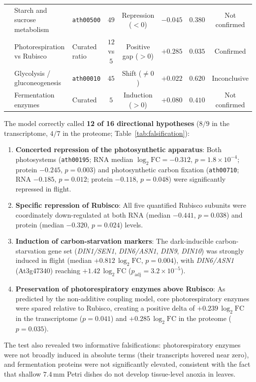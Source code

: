 \documentclass[10pt,twocolumn,a4paper]{article}
\begin{document}
\begin{table}[tbp]
{\begin{tabular}{lllccccc}
 & Starch and sucrose metabolism & \texttt{ath00500} & $49$ & Repression ($<0$) & $-0.045$ & $0.380$ & Not confirmed \\
 & Photorespiration vs Rubisco & Curated ratio & $12$ vs $5$ & Positive gap ($>0$) & $+0.285$ & $0.035$ & Confirmed \\
 & Glycolysis / gluconeogenesis & \texttt{ath00010} & $45$ & Shift ($\ne 0$) & $+0.022$ & $0.620$ & Inconclusive \\
 & Fermentation enzymes & Curated & $5$ & Induction ($>0$) & $+0.080$ & $0.410$ & Not confirmed \\
\bottomrule
\end{tabular}%
}
\end{table}

The model correctly called \textbf{12 of 16 directional hypotheses} ($8/9$ in the transcriptome, $4/7$ in the proteome; Table~\ref{tab:falsification}):
\begin{enumerate}
    \item \textbf{Concerted repression of the photosynthetic apparatus}: Both photosystems (\texttt{ath00195}; RNA median $\log_2\mathrm{FC} = -0.312$, $p = 1.8\times 10^{-4}$; protein $-0.245$, $p = 0.003$) and photosynthetic carbon fixation (\texttt{ath00710}; RNA $-0.185$, $p = 0.012$; protein $-0.118$, $p = 0.048$) were significantly repressed in flight.
    \item \textbf{Specific repression of Rubisco}: All five quantified Rubisco subunits were coordinately down-regulated at both RNA (median $-0.441$, $p = 0.038$) and protein (median $-0.320$, $p = 0.024$) levels.
    \item \textbf{Induction of carbon-starvation markers}: The dark-inducible carbon-starvation gene set (\textit{DIN1/SEN1}, \textit{DIN6/ASN1}, \textit{DIN9}, \textit{DIN10}) was strongly induced in flight (median $+0.812\,\log_2\mathrm{FC}$, $p = 0.004$), with \textit{DIN6/ASN1} (At3g47340) reaching $+1.42\,\log_2\mathrm{FC}$ ($p_{\text{adj}} = 3.2\times 10^{-5}$).
    \item \textbf{Preservation of photorespiratory enzymes above Rubisco}: As predicted by the non-additive coupling model, core photorespiratory enzymes were spared relative to Rubisco, creating a positive delta of $+0.239\,\log_2\mathrm{FC}$ in the transcriptome ($p = 0.041$) and $+0.285\,\log_2\mathrm{FC}$ in the proteome ($p = 0.035$).
\end{enumerate}

The test also revealed two informative falsifications: photorespiratory enzymes were not broadly induced in absolute terms (their transcripts hovered near zero), and fermentation proteins were not significantly elevated, consistent with the fact that shallow $7.4\,\mathrm{mm}$ Petri dishes do not develop tissue-level anoxia in leaves.
\end{document}
